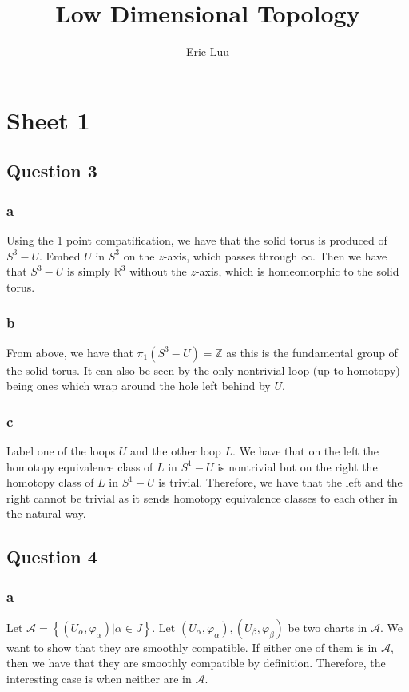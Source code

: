 \documentclass{article}
\title{Low Dimensional Topology}
\author{Eric Luu}
\theoremstyle{definition}
\numberwithin{theorem}{section}
\numberwithin{equation}{section}
\newcommand{\atlas}{\mathcal{A}}
\begin{document}
\section{Sheet 1}


\subsection{Question 3}

\subsubsection{a}
Using the 1 point compatification, we have that the solid torus is produced of $S^3 - U$. Embed $U$ in $S^3$ on the $z$-axis, which passes through $\infty$. Then we have that $S^3 - U$ is simply $\mathbb{R}^3$ without the $z$-axis, which is homeomorphic to the solid torus. 
\subsubsection{b}
From above, we have that $\pi_1(S^3 - U) = \mathbb{Z}$ as this is the fundamental group of the solid torus. It can also be seen by the only nontrivial loop (up to homotopy) being ones which wrap around the hole left behind by $U$. 
\subsubsection{c}
Label one of the loops $U$ and the other loop $L$. We have that on the left the homotopy equivalence class of $L$ in $S^1 - U$ is nontrivial but on the right the homotopy class of $L$ in $S^1 - U$ is trivial. Therefore, we have that the left and the right cannot be trivial as it sends homotopy equivalence classes to each other in the natural way. 
\subsection{Question 4}
\subsubsection{a}
Let $\atlas = \left\{(U_\alpha, \varphi_\alpha) | \alpha \in J\right\}$. Let $(U_\alpha, \varphi_\alpha), (U_\beta, \varphi_\beta)$ be two charts in $\overline{\atlas}$. We want to show that they are smoothly compatible. If either one of them is in $\atlas$, then we have that they are smoothly compatible by definition. Therefore, the interesting case is when neither are in $\atlas$. 
\end{document}
